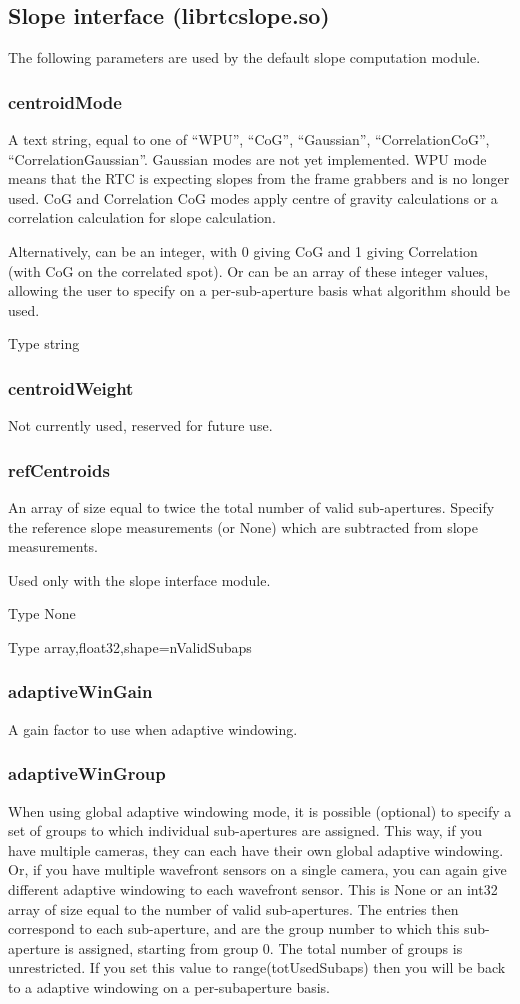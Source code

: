 \documentclass[a4,10pt]{article}
\begin{document}
\subsection{Slope interface (librtcslope.so)}
The following parameters are used by the default slope computation module.
\subsubsection{centroidMode}
A text string, equal to one of ``WPU'', ``CoG'', ``Gaussian'',
``CorrelationCoG'', ``CorrelationGaussian''.  Gaussian modes are not
yet implemented.  WPU mode means that the RTC is expecting slopes from
the frame grabbers and is no longer used.  CoG and Correlation CoG
modes apply centre of gravity calculations or a correlation
calculation for slope calculation.

Alternatively, can be an integer, with 0 giving CoG and 1 giving
Correlation (with CoG on the correlated spot).  Or can be an array of
these integer values, allowing the user to specify on a
per-sub-aperture basis what algorithm should be used.

Type string

\subsubsection{centroidWeight}
Not currently used, reserved for future use.


\subsubsection{refCentroids}
An array of size equal to twice the total number of valid sub-apertures.  Specify the
reference slope measurements (or None) which are subtracted from slope
measurements.

Used only with the slope interface module.

Type None 

Type array,float32,shape=nValidSubaps

\subsubsection{adaptiveWinGain}
A gain factor to use when adaptive windowing.


\subsubsection{adaptiveWinGroup}
When using global adaptive windowing mode, it is possible (optional)
to specify a set of groups to which individual sub-apertures are
assigned.  This way, if you have multiple cameras, they can each have
their own global adaptive windowing.  Or, if you have multiple
wavefront sensors on a single camera, you can again give different
adaptive windowing to each wavefront sensor.  This is None or an int32
array of size equal to the number of valid sub-apertures.  The entries
then correspond to each sub-aperture, and are the group number to
which this sub-aperture is assigned, starting from group 0.  The total
number of groups is unrestricted.  If you set this value to
range(totUsedSubaps) then you will be back to a adaptive windowing on a
per-subaperture basis.
\end{document}
